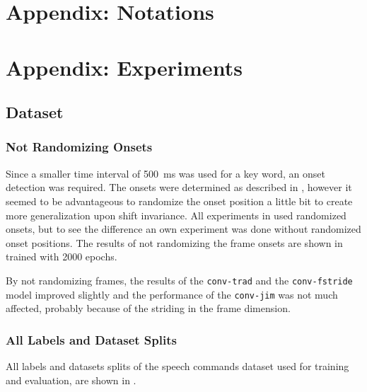 



\chapter{Appendix: Notations}




\chapter{Appendix: Experiments}

\section{Dataset}

\subsection{Not Randomizing Onsets}
Since a smaller time interval of \SI{500}{\milli\second} was used for a key word, an onset detection was required.
The onsets were determined as described in , however it seemed to be advantageous to randomize the onset position a little bit to create more generalization upon shift invariance.
All experiments in  used randomized onsets, but to see the difference an own experiment was done without randomized onset positions. 
The results of not randomizing the frame onsets are shown in  trained with 2000 epochs.

By not randomizing frames, the results of the \texttt{conv-trad} and the \texttt{conv-fstride} model improved slightly and the performance of the \texttt{conv-jim} was not much affected, probably because of the striding in the frame dimension.

\subsection{All Labels and Dataset Splits}
All labels and datasets splits of the speech commands dataset \cite{Warden2018} used for training and evaluation, are shown in .





